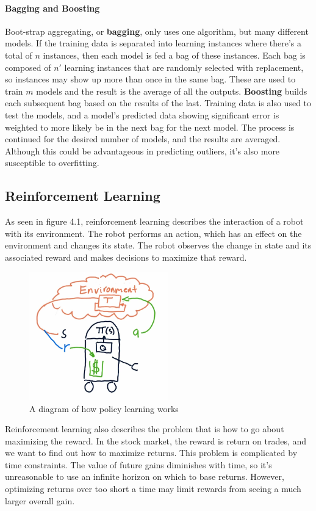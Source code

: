 \paragraph{Bagging and Boosting}
Boot-strap aggregating, or \textbf{bagging}, only uses one algorithm, but many different models. If the training data is separated into learning instances where there's a total of $n$ instances, then each model is fed a bag of these instances. Each bag is composed of $n'$ learning instances that are randomly selected with replacement, so instances may show up more than once in the same bag. These are used to train $m$ models and the result is the average of all the outputs. \textbf{Boosting} builds each subsequent bag based on the results of the last. Training data is also used to test the models, and a model's predicted data showing significant error is weighted to more likely be in the next bag for the next model. The process is continued for the desired number of models, and the results are averaged. Although this could be advantageous in predicting outliers, it's also more susceptible to overfitting.

\subsection{Reinforcement Learning}
As seen in figure 4.1, reinforcement learning describes the interaction of a robot with its environment. The robot performs an action, which has an effect on the environment and changes its state. The robot observes the change in state and its associated reward and makes decisions to maximize that reward.

\begin{figure}[h]
\centering
\includegraphics[width=6cm]{images/rl.png}
\caption{A diagram of how policy learning works}
\end{figure}

Reinforcement learning also describes the problem that is how to go about maximizing the reward. In the stock market, the reward is return on trades, and we want to find out how to maximize returns. This problem is complicated by time constraints. The value of future gains diminishes with time, so it's unreasonable to use an infinite horizon on which to base returns. However, optimizing returns over too short a time may limit rewards from seeing a much larger overall gain.

